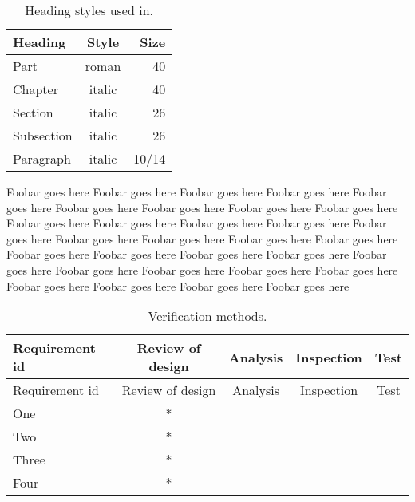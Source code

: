 \documentclass{tufte-book}
\begin{document}
\begin{table}[h]
  \centering
    \begin{tabular}{lcr}
      \toprule
      Heading & Style & Size \\
      \midrule
      Part & roman & {40} \\
      Chapter & italic & {40} \\
      Section & italic & {26} \\
      Subsection & italic & {26} \\
      Paragraph & italic & 10/14 \\
      \bottomrule
    \end{tabular}
  \caption{Heading styles used in.}
\end{table}

Foobar goes here Foobar goes here Foobar goes here Foobar goes here Foobar goes here Foobar goes here Foobar goes here Foobar goes here Foobar goes here Foobar goes here Foobar goes here Foobar goes here Foobar goes here Foobar goes here Foobar goes here Foobar goes here Foobar goes here Foobar goes here Foobar goes here Foobar goes here Foobar goes here Foobar goes here Foobar goes here Foobar goes here Foobar goes here Foobar goes here Foobar goes here Foobar goes here Foobar goes here Foobar goes here Foobar goes here 

\begin{longtable}{lcccc}
\caption{Verification methods.}\\
\toprule
Requirement id & Review of design & Analysis & Inspection & Test \\
\toprule
\endfirsthead
\toprule
Requirement id & Review of design & Analysis & Inspection & Test \\
\endhead
\bottomrule
\endfoot
One & * & & & \\
\midrule
Two & * & & & \\
\midrule
Three & * & & & \\
\midrule
Four & * & & & \\
\end{longtable}
\end{document}
